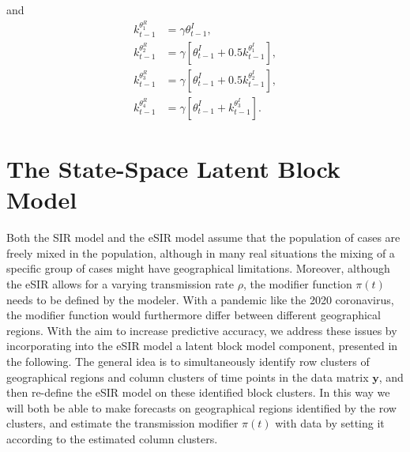 \documentclass[10pt,a4paper]{article}
\begin{document}
%
and 
%
\begin{equation*}
	\begin{split}	
		k_{t-1}^{\theta^R_1} &= \gamma \theta^I_{t-1}, \\
		k_{t-1}^{\theta^R_2} &= \gamma[\theta_{t-1}^I + 0.5 k_{t-1}^{\theta^I_1}], \\
		k_{t-1}^{\theta^R_3} &= \gamma[\theta_{t-1}^I + 0.5 k_{t-1}^{\theta^I_2}], \\
		k_{t-1}^{\theta^R_4} &= \gamma[\theta_{t-1}^I + k_{t-1}^{\theta^I_3}]. 
	\end{split}
\end{equation*}
%	






\section{The State-Space Latent Block Model}
Both the SIR model and the eSIR model assume that the population of cases are freely mixed in the population, although in many real situations the mixing of a specific group of cases might have geographical limitations. Moreover, although the eSIR allows for a varying transmission rate $\rho$, the modifier function $\pi(t)$ needs to be defined by the modeler. With a pandemic like the 2020 coronavirus, the modifier function would furthermore differ between different geographical regions. With the aim to increase predictive accuracy, we address these issues by incorporating into the eSIR model a latent block model component, presented in the following. The general idea is to simultaneously identify row clusters of geographical regions and column clusters of time points in the data matrix $\mathbf{y}$, and then re-define the eSIR model on these identified block clusters. In this way we will both be able to make forecasts on geographical regions identified by the row clusters, and estimate the transmission modifier $\pi(t)$ with data by setting it according to the estimated column clusters.
 
\end{document}
